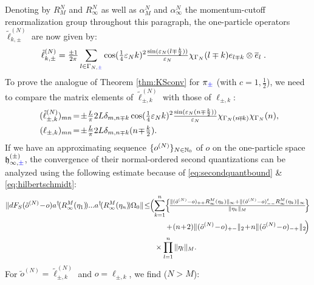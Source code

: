 \documentclass[a4paper, 11pt]{article}
\newcommand{\fh}{\mathfrak{h}}
\DeclareMathOperator{\1}{\mathds{1}}
\begin{document}
Denoting by $R^{N}_{M}$ and $R^{N}_{\infty}$ as well as $\alpha^{N}_{M}$ and $\alpha^{N}_{\infty}$ the momentum-cutoff renormalization group throughout this paragraph, the one-particle operators $\tilde{\ell}^{(N)}_{k,\pm}$ are now given by:
\begin{align}
\label{eq:latvirachi1pmom}
\tilde{\ell}^{(N)}_{k,\pm} & = \tfrac{\pm1}{2\pi}\sum_{l\in\Gamma_{N,{\color{blue}\pm}}} \cos(\tfrac{1}{4}\varepsilon_{N}k)^{2}\tfrac{\sin(\varepsilon_{N}(l\mp\frac{k}{2}))}{\varepsilon_{N}}\chi_{\Gamma_{N}}(l\mp k)e_{l\mp k}\otimes \overline{e}_{l}\;.
\end{align}
To prove the analogue of Theorem \ref{thm:KSconv} for $\pi_{{\color{blue}\pm}}$ (with $c=1,\tfrac{1}{2}$), we need to compare the matrix elements of $\tilde{\ell}^{(N)}_{\pm,k}$ with those of $\ell_{\pm,k}$:
\begin{align}
\label{eq:latvirachi1pmommat}
(\tilde{\ell}^{(N)}_{\pm,k})_{mn} &\!=\!\pm\tfrac{L}{\pi}2L\delta_{m,n\mp k}\cos(\tfrac{1}{4}\vep_{N}k)^{2}\tfrac{\sin(\vep_{N}(n\mp\frac{k}{2}))}{\vep_{N}}\chi_{\Gamma_{N}(n\!\mp\!k)}\chi_{\Gamma_{N}}(n), \\ \nonumber
(\ell_{\pm,k})_{mn} &\!=\!\pm\tfrac{L}{\pi}2L\delta_{m,n\mp k}(n\!\mp\!\tfrac{k}{2}).
\end{align}
If we have an approximating sequence $\{o^{(N)}\}_{N\in\mathbb{N}_{0}}$ of $o$ on the one-particle space $\fh^{(\pm)}_{\infty,{\color{blue}\pm}}$, the convergence of their normal-ordered second quantizations can be analyzed using the following estimate because of \eqref{eq:secondquantbound} \& \eqref{eq:hilbertschmidt}:
\begin{align}
\label{eq:noquantconv} \nonumber
\|dF_{S}(\tilde{o}^{(N)}\!-\!o)a^{\dag}\!(R^{M}_{\infty}(\eta_{1})\!)...a^{\dag}\!(R^{M}_{\infty}(\eta_{n})\!)\Omega_{0}\| &\!\leq\!\!\Big(\!\sum_{k=1}^{n}\!\Big\{\!\tfrac{\|(\tilde{o}^{(N)} - o)_{++}R^{M}_{\infty}(\eta_{k})\|_{\infty}+\|(\tilde{o}^{(N)} - o)^{t}_{- -}R^{M}_{\infty}(\eta_{k})\|_{\infty}}{\|\eta_{k}\|_{M}}\!\Big\} \\ \nonumber
 & \hspace{1cm} +\!(n\!+\!2)\|(\tilde{o}^{(N)}\!-\!o)_{+-}\|_{2}\!+\!n\|(\tilde{o}^{(N)}\!-\!o)_{-+}\|_{2}\!\Big) \\
 & \hspace{0.5cm} \times \prod_{l=1}^{n}\|\eta_{l}\|_{M}.
\end{align}
For $\tilde{o}^{(N)}=\tilde{\ell}^{(N)}_{\pm,k}$ and $o = \ell_{\pm,k}$, we find ($N>M$):
\end{document}
